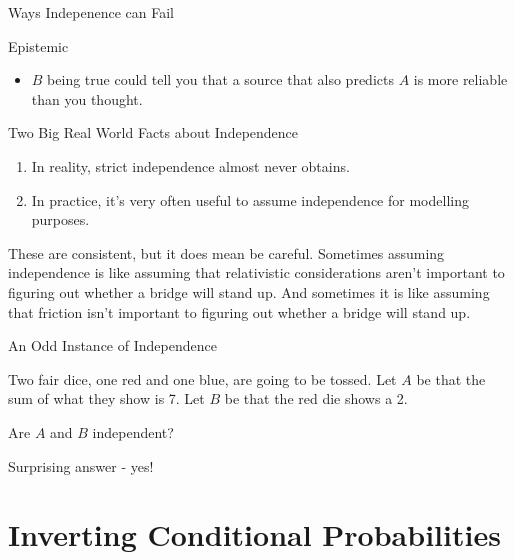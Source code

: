 \documentclass[
  ignorenonframetext,
]{beamer}
\providecommand{\tightlist}{%
  \setlength{\itemsep}{0pt}\setlength{\parskip}{0pt}}
\renewcommand{\,}{\text{, }}
\begin{document}
\begin{frame}{Ways Indepenence can Fail}
\protect\hypertarget{ways-indepenence-can-fail}{}

Epistemic

\begin{itemize}
\tightlist
\item
  \(B\) being true could tell you that a source that also predicts \(A\)
  is more reliable than you thought.
\end{itemize}

\end{frame}

\begin{frame}{Two Big Real World Facts about Independence}
\protect\hypertarget{two-big-real-world-facts-about-independence}{}

\begin{enumerate}
\tightlist
\item
  In reality, strict independence almost never obtains. \pause
\item
  In practice, it's very often useful to assume independence for
  modelling purposes. \pause
\end{enumerate}

These are consistent, but it does mean be careful. Sometimes assuming
independence is like assuming that relativistic considerations aren't
important to figuring out whether a bridge will stand up. And sometimes
it is like assuming that friction isn't important to figuring out
whether a bridge will stand up.

\end{frame}

\begin{frame}{An Odd Instance of Independence}
\protect\hypertarget{an-odd-instance-of-independence}{}

Two fair dice, one red and one blue, are going to be tossed. Let \(A\)
be that the sum of what they show is 7. Let \(B\) be that the red die
shows a 2.

\begin{description}
\tightlist
\item[Question]
Are \(A\) and \(B\) independent? \pause
\end{description}

Surprising answer - yes!

\end{frame}

\hypertarget{inverting-conditional-probabilities}{%
\section{Inverting Conditional
Probabilities}\label{inverting-conditional-probabilities}}
\end{document}
